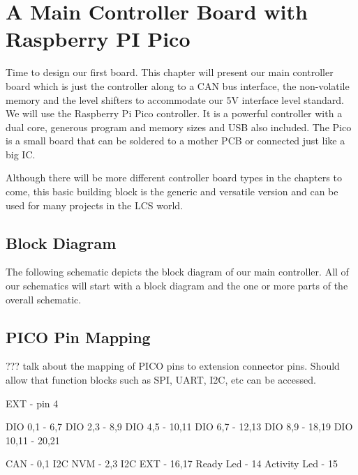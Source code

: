 \chapter{A Main Controller Board with Raspberry PI Pico}

Time to design our first board. This chapter will present our main controller board which is just the controller along to a CAN bus interface, the non-volatile memory and the level shifters to accommodate our 5V interface level standard. We will use the Raspberry Pi Pico controller. It is a powerful controller with a dual core, generous program and memory sizes and USB also included. The Pico is a small board that can be soldered to a mother PCB or connected just like a big IC. 

Although there will be more different controller board types in the chapters to come, this basic building block is the generic and versatile version and can be used for many projects in the LCS world.

\section{Block Diagram}

The following schematic depicts the block diagram of our main controller. All of our schematics will start with a block diagram and the one or more parts of the overall schematic.


\section{PICO Pin Mapping}

??? talk about the mapping of PICO pins to extension connector pins. Should allow that function blocks such as SPI, UART, I2C, etc can be accessed.

EXT             - pin 4

DIO 0,1         - 6,7
DIO 2,3         - 8,9
DIO 4,5         - 10,11
DIO 6,7         - 12,13
DIO 8,9         - 18,19
DIO 10,11       - 20,21

CAN             - 0,1
I2C NVM         - 2,3
I2C EXT         - 16,17
Ready Led       - 14
Activity Led    - 15


